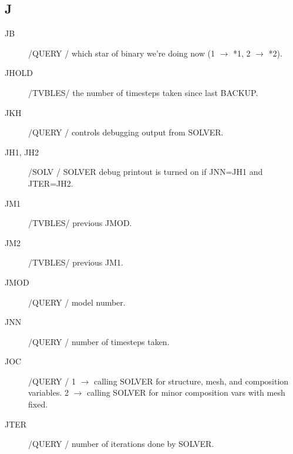 \documentclass{article}
\begin{document}
\subsection*{J}
\begin{description}
	\item[JB]		    /QUERY / which star of binary we're doing now (1 $\to$ *1, 2 $\to$ *2).

	\item[JHOLD]   	/TVBLES/ the number of timesteps taken since last BACKUP.

	\item[JKH]		    /QUERY / controls debugging output from SOLVER.

	\item[JH1, JH2]    /SOLV  / SOLVER debug printout is turned on if JNN=JH1 and JTER=JH2.

	\item[JM1]		    /TVBLES/ previous JMOD.

	\item[JM2]		    /TVBLES/ previous JM1.

	\item[JMOD]		/QUERY / model number.

	\item[JNN]		    /QUERY / number of timesteps taken.

	\item[JOC]		    /QUERY / 1 $\to$ calling SOLVER for structure, mesh, and composition variables.
	                     2 $\to$ calling SOLVER for minor composition vars with mesh fixed.
	
	\item[JTER]		/QUERY / number of iterations done by SOLVER.

\end{description}
\end{document}
